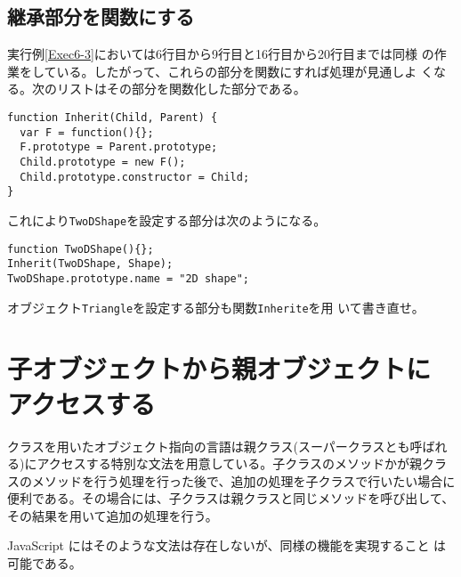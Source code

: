 \subsection{継承部分を関数にする}
\begin{Exec}\upshape\label{Exec6-4}
実行例\ref{Exec6-3}においては6行目から9行目と16行目から20行目までは同様
 の作業をしている。したがって、これらの部分を関数にすれば処理が見通しよ
 くなる。次のリストはその部分を関数化した部分である。
\begin{verbatim}
function Inherit(Child, Parent) {
  var F = function(){};
  F.prototype = Parent.prototype;
  Child.prototype = new F(); 
  Child.prototype.constructor = Child;
}
\end{verbatim}
これにより\texttt{TwoDShape}を設定する部分は次のようになる。
\begin{verbatim}
function TwoDShape(){};
Inherit(TwoDShape, Shape);
TwoDShape.prototype.name = "2D shape";
\end{verbatim}
\end{Exec}
\begin{Prob}\upshape
 オブジェクト\texttt{Triangle}を設定する部分も関数\texttt{Inherite}を用
 いて書き直せ。
\end{Prob}
\section{子オブジェクトから親オブジェクトにアクセスする}
クラスを用いたオブジェクト指向の言語は親クラス(スーパークラスとも呼ばれ
る)にアクセスする特別な文法を用意している。子クラスのメソッドかが親クラ
スのメソッドを行う処理を行った後で、追加の処理を子クラスで行いたい場合に
便利である。その場合には、子クラスは親クラスと同じメソッドを呼び出して、
その結果を用いて追加の処理を行う。

JavaScript にはそのような文法は存在しないが、同様の機能を実現すること
は可能である。

